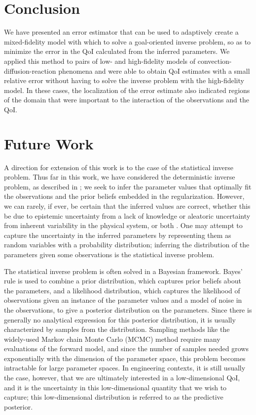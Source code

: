 \section{Conclusion}\label{sect:conc}

We have presented an error estimator that can be used to adaptively create a mixed-fidelity model with which to solve a goal-oriented inverse problem, so as to minimize the error in the QoI calculated from the inferred parameters. We applied this method to pairs of low- and high-fidelity models of convection-diffusion-reaction phenomena and were able to obtain QoI estimates with a small relative error without having to solve the inverse problem with the high-fidelity model. In these cases, the localization of the error estimate also indicated regions of the domain that were important to the interaction of the observations and the QoI.

\section{Future Work} 

A direction for extension of this work is to the case of the statistical inverse problem. Thus far in this work, we have considered the deterministic inverse problem, as described in ; we seek to infer the parameter values that optimally fit the observations and the prior beliefs embedded in the regularization. However, we can rarely, if ever, be certain that the inferred values are correct, whether this be due to epistemic uncertainty from a lack of knowledge or aleatoric uncertainty from inherent variability in the physical system, or both \cite{Ober04}. One may attempt to capture the uncertainty in the inferred parameters by representing them as random variables with a probability distribution; inferring the distribution of the parameters given some observations is the statistical inverse problem. 

The statistical inverse problem is often solved in a Bayesian framework. Bayes' rule is used to combine a prior distribution, which captures prior beliefs about the parameters, and a likelihood distribution, which captures the likelihood of observations given an instance of the parameter values and a model of noise in the observations, to give a posterior distribution on the parameters. Since there is generally no analytical expression for this posterior distribution, it is usually characterized by samples from the distribution. Sampling methods like the widely-used Markov chain Monte Carlo (MCMC) method require many evaluations of the forward model, and since the number of samples needed grows exponentially with the dimension of the parameter space, this problem becomes intractable for large parameter spaces. In engineering contexts, it is still usually the case, however, that we are ultimately interested in a low-dimensional QoI, and it is the uncertainty in this low-dimensional quantity that we wish to capture; this low-dimensional distribution is referred to as the predictive posterior.

